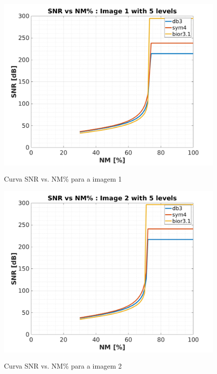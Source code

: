 \documentclass{article}
\begin{document}
\begin{figure}[H]
	\begin{center}
		\label{fig:Q1_b_im1}
		\includegraphics[scale=0.35]{../Q1_b_im1.png}
		\caption{Curva SNR vs. NM\% para a imagem 1}
	\end{center}
\end{figure}  

\begin{figure}[H]
	\begin{center}
		\label{fig:Q1_b_im2}
		\includegraphics[scale=0.35]{../Q1_b_im2.png}
		\caption{Curva SNR vs. NM\% para a imagem 2}
	\end{center}
\end{figure}  
\end{document}
